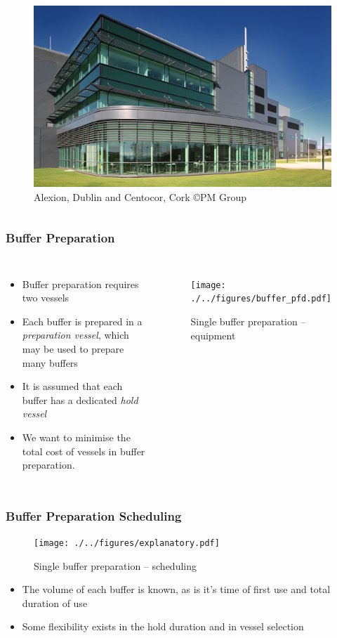 \documentclass{beamer}
\begin{document}
\begin{frame}
\begin{columns}
\begin{figure}
            \includegraphics[angle=0,scale=0.22]{centocor.jpg}
            \caption{Alexion, Dublin and Centocor, Cork \copyright PM Group}
        \end{figure}
    \end{columns}
\end{frame}

\begin{frame}
    \frametitle{Buffer Preparation}
    \begin{columns}
        \begin{itemize}
            \item Buffer preparation requires two vessels
            \item Each buffer is prepared in a \emph{preparation vessel}, which
                may be used to prepare many buffers
            \item It is assumed that each buffer has a dedicated \emph{hold
                vessel}
            \item We want to minimise the total cost of vessels in buffer
                preparation.
        \end{itemize}
        \begin{figure}
            \centering
            \texttt{[image: ./../figures/buffer\_pfd.pdf]}
            \caption{Single buffer preparation -- equipment}
        \end{figure}
    \end{columns}
\end{frame}

\begin{frame}
    \frametitle{Buffer Preparation Scheduling}
    \begin{figure}
        \centering
        \texttt{[image: ./../figures/explanatory.pdf]}
        \caption{Single buffer preparation -- scheduling}
    \end{figure}
    \begin{itemize}
    \item The volume of each buffer is known, as is it's time of first use and
        total duration of use
    \item Some flexibility exists in the hold duration and in vessel selection
    \end{itemize}
\end{frame}
\end{document}
